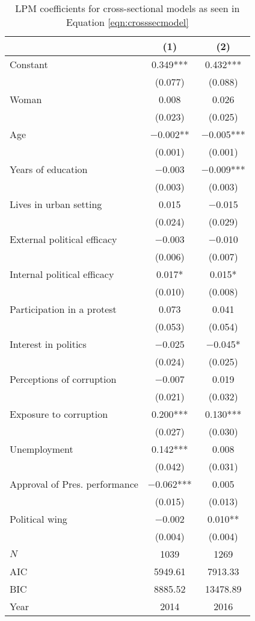 \documentclass[12pt,a4]{article}
\begin{document}
\begin{table}[htbp]
\begin{center}
\caption{LPM coefficients for cross-sectional models as seen in Equation \ref{eqn:crosssecmodel}}
\label{tab:complexmodlpmcross}

\begin{tabular}[t]{lcc}
\toprule
  & (1) & (2)\\
\midrule
Constant & \num{0.349}*** & \num{0.432}***\\
 & (\num{0.077}) & (\num{0.088})\\
Woman & \num{0.008} & \num{0.026}\\
 & (\num{0.023}) & (\num{0.025})\\
Age & \num{-0.002}** & \num{-0.005}***\\
 & (\num{0.001}) & (\num{0.001})\\
Years of education & \num{-0.003} & \num{-0.009}***\\
 & (\num{0.003}) & (\num{0.003})\\
Lives in urban setting & \num{0.015} & \num{-0.015}\\
 & (\num{0.024}) & (\num{0.029})\\
External political efficacy & \num{-0.003} & \num{-0.010}\\
 & (\num{0.006}) & (\num{0.007})\\
Internal political efficacy & \num{0.017}* & \num{0.015}*\\
 & (\num{0.010}) & (\num{0.008})\\
Participation in a protest & \num{0.073} & \num{0.041}\\
 & (\num{0.053}) & (\num{0.054})\\
Interest in politics & \num{-0.025} & \num{-0.045}*\\
 & (\num{0.024}) & (\num{0.025})\\
Perceptions of corruption & \num{-0.007} & \num{0.019}\\
 & (\num{0.021}) & (\num{0.032})\\
Exposure to corruption & \num{0.200}*** & \num{0.130}***\\
 & (\num{0.027}) & (\num{0.030})\\
Unemployment & \num{0.142}*** & \num{0.008}\\
 & (\num{0.042}) & (\num{0.031})\\
Approval of Pres. performance & \num{-0.062}*** & \num{0.005}\\
 & (\num{0.015}) & (\num{0.013})\\
Political wing & \num{-0.002} & \num{0.010}**\\
 & (\num{0.004}) & (\num{0.004})\\
\midrule
$N$ & \num{1039} & \num{1269}\\
AIC & \num{5949.61} & \num{7913.33}\\
BIC & \num{8885.52} & \num{13478.89}\\
Year & 2014 & 2016\\
\bottomrule
\end{tabular}



\end{center}
\end{table}
\end{document}
